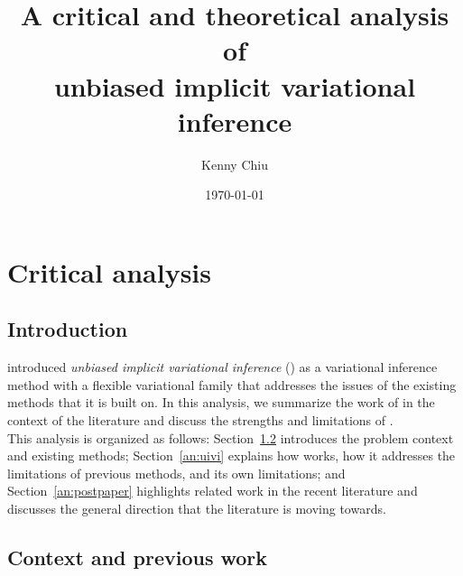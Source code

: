\documentclass[10pt]{article}
\title{A critical and theoretical analysis of\\unbiased implicit variational inference}
\author{Kenny Chiu}
\date{\today}
\begin{document}
\maketitle


\newpage


\section{Critical analysis}

\subsection{Introduction}

\citet{Titsias:2019} introduced \textit{unbiased implicit variational inference} (\uivi) as a variational inference method with a flexible variational family that addresses the issues of the existing methods that it is built on. In this analysis, we summarize the work of \citet{Titsias:2019} in the context of the literature and discuss the strengths and limitations of \uivi.
\\

This analysis is organized as follows: Section~\ref{an:literature} introduces the problem context and existing methods; Section~\ref{an:uivi} explains how \uivi works, how it addresses the limitations of previous methods, and its own limitations; and Section~\ref{an:postpaper} highlights related work in the recent literature and discusses the general direction that the literature is moving towards.

\subsection{Context and previous work} \label{an:literature}
\end{document}
